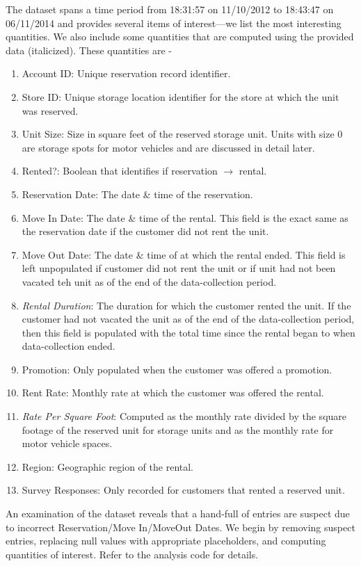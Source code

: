 \documentclass[times]{aastex6}
\begin{document}
The dataset spans a time period from 18:31:57 on 11/10/2012 to 18:43:47 on 06/11/2014 and provides several items of interest---we list the most interesting quantities. We also include some quantities that are computed using the provided data (italicized). These quantities are -
\begin{enumerate}
    \item Account ID: Unique reservation record identifier.
    \item Store ID: Unique storage location identifier for the store at which the unit was reserved.
    \item Unit Size: Size in square feet of the reserved storage unit. Units with size $0$ are storage spots for motor vehicles and are discussed in detail later.
    \item Rented?: Boolean that identifies if reservation $\rightarrow$ rental.
    \item Reservation Date: The date \& time of the reservation.
    \item Move In Date: The date \& time of the rental. This field is the exact same as the reservation date if the customer did not rent the unit.
    \item Move Out Date: The date \& time of at which the rental ended. This field is left unpopulated if customer did not rent the unit or if unit had not been vacated teh unit as of the end of the data-collection period.
    \item \emph{Rental Duration}: The duration for which the customer rented the unit. If the customer had not vacated the unit as of the end of the data-collection period, then this field is populated with the total time since the rental began to when data-collection ended.
    \item Promotion: Only populated when the customer was offered a promotion.
    \item Rent Rate: Monthly rate at which the customer was offered the rental.
    \item \emph{Rate Per Square Foot}: Computed as the monthly rate divided by the square footage of the reserved unit for storage units and as the monthly rate for motor vehicle spaces.
    \item Region: Geographic region of the rental.
    \item Survey Responses: Only recorded for customers that rented a reserved unit.
\end{enumerate}

An examination of the dataset reveals that a hand-full of entries are suspect due to incorrect Reservation/Move In/MoveOut Dates. We begin by removing suspect entries, replacing null values with appropriate placeholders, and computing quantities of interest. Refer to the analysis code for details.
\end{document}
